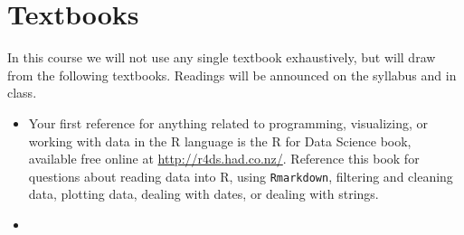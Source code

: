 \documentclass[12pt]{article}
\begin{document}
\section{Textbooks}

In this course we will not use any single textbook exhaustively, but will draw from the following textbooks.
Readings will be announced on the syllabus and in class.

\begin{itemize}
  \item Your first reference for anything related to programming, visualizing, or working with data in the R language is the R for Data Science book, available free online at \url{http://r4ds.had.co.nz/}.
  Reference this book for questions about reading data into R, using \texttt{Rmarkdown}, filtering and cleaning data, plotting data, dealing with dates, or dealing with strings.

  \item
\end{itemize}

\end{document}
